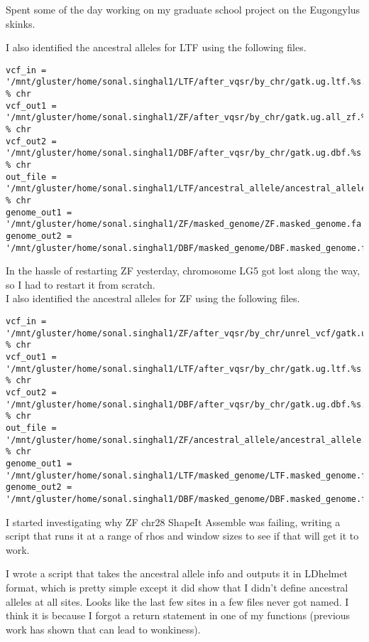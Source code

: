 \documentclass[idxtotoc,hyperref,openany,oneside]{labbook} %
\begin{document}
Spent some of the day working on my graduate school project on the Eugongylus skinks.

I also identified the ancestral alleles for LTF using the following files.
\begin{verbatim}
vcf_in = '/mnt/gluster/home/sonal.singhal1/LTF/after_vqsr/by_chr/gatk.ug.ltf.%s.filtered.coverage.recoded_biallelicSNPs.vqsr.vcf.gz' % chr
vcf_out1 = '/mnt/gluster/home/sonal.singhal1/ZF/after_vqsr/by_chr/gatk.ug.all_zf.%s.coverage.filtered.vqsr.vcf.gz' % chr
vcf_out2 = '/mnt/gluster/home/sonal.singhal1/DBF/after_vqsr/by_chr/gatk.ug.dbf.%s.filtered.coverage.vqsr.vcf.gz' % chr
out_file = '/mnt/gluster/home/sonal.singhal1/LTF/ancestral_allele/ancestral_allele.%s.csv' % chr
genome_out1 = '/mnt/gluster/home/sonal.singhal1/ZF/masked_genome/ZF.masked_genome.fa'
genome_out2 = '/mnt/gluster/home/sonal.singhal1/DBF/masked_genome/DBF.masked_genome.fa'
\end{verbatim}

In the hassle of restarting ZF yesterday, chromosome LG5 got lost along the way, so I had to restart it from scratch. \\

I also identified the ancestral alleles for ZF using the following files.
\begin{verbatim}
vcf_in = '/mnt/gluster/home/sonal.singhal1/ZF/after_vqsr/by_chr/unrel_vcf/gatk.ug.unrel_zf.%s.coverage.filtered.recoded_biallelicSNPs.nomendel.vcf.gz' % chr
vcf_out1 = '/mnt/gluster/home/sonal.singhal1/LTF/after_vqsr/by_chr/gatk.ug.ltf.%s.filtered.coverage.vqsr.vcf.gz' % chr
vcf_out2 = '/mnt/gluster/home/sonal.singhal1/DBF/after_vqsr/by_chr/gatk.ug.dbf.%s.filtered.coverage.vqsr.vcf.gz' % chr
out_file = '/mnt/gluster/home/sonal.singhal1/ZF/ancestral_allele/ancestral_allele.%s.csv' % chr
genome_out1 = '/mnt/gluster/home/sonal.singhal1/LTF/masked_genome/LTF.masked_genome.fa'
genome_out2 = '/mnt/gluster/home/sonal.singhal1/DBF/masked_genome/DBF.masked_genome.fa'
\end{verbatim}

I started investigating why ZF chr28 ShapeIt Assemble was failing, writing a script that runs it at a range of rhos and window sizes to see if that will get it to work.

I wrote a script that takes the ancestral allele info and outputs it in LDhelmet format, which is pretty simple except it did show that I didn't define ancestral alleles at all sites. Looks like the last few sites in a few files never got named. I think it is because I forgot a return statement in one of my functions (previous work has shown that can lead to wonkiness). \\
\end{document}
